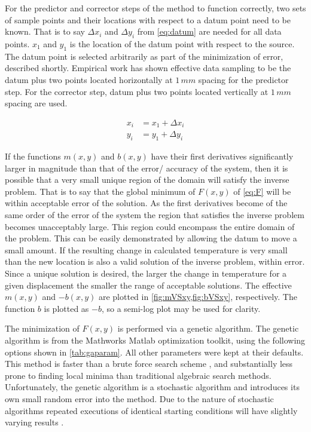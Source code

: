 \documentclass[preprint,12pt]{elsarticle}
\begin{document}
For the predictor and corrector steps of the method to function correctly, two sets of sample points and their locations with respect to a datum point need to be known.  That is to say $\Delta x_i$ and $\Delta y_i$ from \cref{eq:datum} are needed for all data points.  $x_1$ and $y_1$ is the location of the datum point with respect to the source.  The datum point is selected arbitrarily as part of the minimization of error, described shortly.  Empirical work has shown effective data sampling to be the datum plus two points located horizontally at $1\, mm$ spacing for the predictor step.  For the corrector step, datum plus two points located vertically at $1\, mm$ spacing are used.

\begin{subequations}
\label{eq:datum}
\begin{align}
x_i &= x_1 + \Delta x_i \\
y_i &= y_1 + \Delta y_i
\end{align}
\end{subequations}

If the functions $m\left( x,y \right)$ and $b\left( x,y \right)$ have their first derivatives significantly larger in magnitude than that of the error/ accuracy of the system, then it is possible that a very small unique region of the domain will satisfy the inverse problem.  That is to say that the global minimum of $F\left( x,y \right)$ of \cref{eq:F} will be within acceptable error of the solution.  As the first derivatives become of the same order of the error of the system the region that satisfies the inverse problem becomes unacceptably large.  This region could encompass the entire domain of the problem.  This can be easily demonstrated by allowing the datum to move a small amount.  If the resulting change in calculated temperature is very small than the new location is also a valid solution of the inverse problem, within error.  Since a unique solution is desired, the larger the change in temperature for a given displacement the smaller the range of acceptable solutions.  The effective $m\left( x,y \right)$ and $-b\left( x,y \right)$ are plotted in \cref{fig:mVSxy,fig:bVSxy}, respectively.  The function $b$ is plotted as $-b$, so a semi-log plot may be used for clarity.

The minimization of $F\left( x,y \right)$ is performed via a genetic algorithm.  The genetic algorithm is from the Mathworks Matlab\cite{matlabsoftware} optimization toolkit, using the following options shown in \cref{tab:gaparam}.  All other parameters were kept at their defaults.  This method is faster than a brute force search scheme , and substantially less prone to finding local minima than traditional algebraic search methods.  Unfortunately, the genetic algorithm is a stochastic algorithm and introduces its own small random error into the method.  Due to the nature of stochastic algorithms repeated executions of identical starting conditions will have slightly varying results \cite{onwubiko}.
\end{document}
